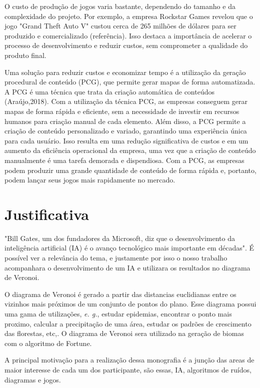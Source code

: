 \documentclass[12pt]{tcc}
\begin{document}
O custo de produção de jogos varia bastante, dependendo do tamanho e da complexidade do projeto. Por exemplo, a empresa Rockstar Games revelou que o jogo "Grand Theft Auto V" custou cerca de 265 milhões de dólares para ser produzido e comercializado (referência). Isso destaca a importância de acelerar o processo de desenvolvimento e reduzir custos, sem comprometer a qualidade do produto final.

Uma solução para reduzir custos e economizar tempo é a utilização da geração procedural de conteúdo (PCG), que permite gerar mapas de forma automatizada. A PCG é uma técnica que trata da criação automática de conteúdos (Araújo,2018). Com a utilização da técnica PCG, as empresas conseguem gerar mapas de forma rápida e eficiente, sem a necessidade de investir em recursos humanos para criação manual de cada elemento. Além disso, a PCG permite a criação de conteúdo personalizado e variado, garantindo uma experiência única para cada usuário. Isso resulta em uma redução significativa de custos e em um aumento da eficiência operacional da empresa, uma vez que a criação de conteúdo manualmente é uma tarefa demorada e dispendiosa. Com a PCG, as empresas podem produzir uma grande quantidade de conteúdo de forma rápida e, portanto, podem lançar seus jogos mais rapidamente no mercado.
\section{Justificativa}

"Bill Gates, um dos fundadores da Microsoft, diz que o desenvolvimento da inteligência artificial (IA) é o avanço tecnológico mais importante em décadas"\space\citep{inteligencia_artificial_e_avanco_bbc}. É possível ver a relevância do tema, e justamente por isso o nosso trabalho acompanhara o desenvolvimento de um IA e utilizara os resultados no diagrama de Veronoi.

O diagrama de Veronoi é gerado a partir das distancias euclidianas entre os vizinhos mais próximos de um conjunto de pontos do plano\space\citep{diagrama_de_voronoi:_uma_exploracao_nas_distancias_euclidiana_e_do_taxi}. Esse diagrama possui uma gama de utilizações, \emph{e. g.}, estudar epidemias, encontrar o ponto mais proximo, calcular a precipitação de uma área, 
estudar os padrões de crescimento das florestas, etc,\space\citep{poligonos_de_thiessen_ou_voronoi}. O diagrama de Veronoi sera utilizado na geração de biomas com o algoritmo de Fortune.

A principal motivação para a realização dessa monografia é a junção das areas de maior interesse de cada um dos participante, são essas, IA, algoritmos de ruídos, diagramas e jogos.
\end{document}
